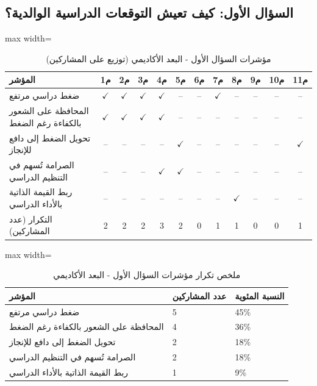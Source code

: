 \documentclass[12pt,oneside]{report}
\begin{document}
\subsection{السؤال الأول: كيف تعيش التوقعات الدراسية الوالدية؟}
\begin{table}[H]
\centering
\caption{مؤشرات السؤال الأول - البعد الأكاديمي (توزيع على المشاركين)}
\scriptsize
\renewcommand{\arraystretch}{1.3}
\setlength{\tabcolsep}{4pt}
\begin{adjustbox}{max width=\textwidth}
\begin{tabular}{l c c c c c c c c c c c}
\toprule
\textbf{المؤشر} & \textbf{م1} & \textbf{م2} & \textbf{م3} & \textbf{م4} & \textbf{م5} & \textbf{م6} & \textbf{م7} & \textbf{م8} & \textbf{م9} & \textbf{م10} & \textbf{م11} \\
\midrule
ضغط دراسي مرتفع & $\checkmark$ & $\checkmark$ & $\checkmark$ & $\checkmark$ & -- & -- & $\checkmark$ & -- & -- & -- & -- \\
المحافظة على الشعور بالكفاءة رغم الضغط & $\checkmark$ & $\checkmark$ & $\checkmark$ & $\checkmark$ & -- & -- & -- & -- & -- & -- & -- \\
تحويل الضغط إلى دافع للإنجاز & -- & -- & -- & -- & $\checkmark$ & -- & -- & -- & -- & -- & $\checkmark$ \\
الصرامة تُسهم في التنظيم الدراسي & -- & -- & -- & $\checkmark$ & $\checkmark$ & -- & -- & -- & -- & -- & -- \\
ربط القيمة الذاتية بالأداء الدراسي & -- & -- & -- & -- & -- & -- & -- & $\checkmark$ & -- & -- & -- \\
التكرار (عدد المشاركين) & 2 & 2 & 2 & 3 & 2 & 0 & 1 & 1 & 0 & 0 & 1 \\
\bottomrule
\end{tabular}
\end{adjustbox}
\end{table}
\begin{table}[H]
\centering
\caption{ملخص تكرار مؤشرات السؤال الأول - البعد الأكاديمي}
\small
\renewcommand{\arraystretch}{1.3}
\setlength{\tabcolsep}{4pt}
\begin{adjustbox}{max width=\textwidth}
\begin{tabular}{p{6cm} p{4cm} p{4cm}}
\toprule
\textbf{المؤشر} & \textbf{عدد المشاركين} & \textbf{النسبة المئوية} \\
\midrule
ضغط دراسي مرتفع & 5 & 45\% \\
المحافظة على الشعور بالكفاءة رغم الضغط & 4 & 36\% \\
تحويل الضغط إلى دافع للإنجاز & 2 & 18\% \\
الصرامة تُسهم في التنظيم الدراسي & 2 & 18\% \\
ربط القيمة الذاتية بالأداء الدراسي & 1 & 9\% \\
\bottomrule
\end{tabular}
\end{adjustbox}
\end{table}
\end{document}
